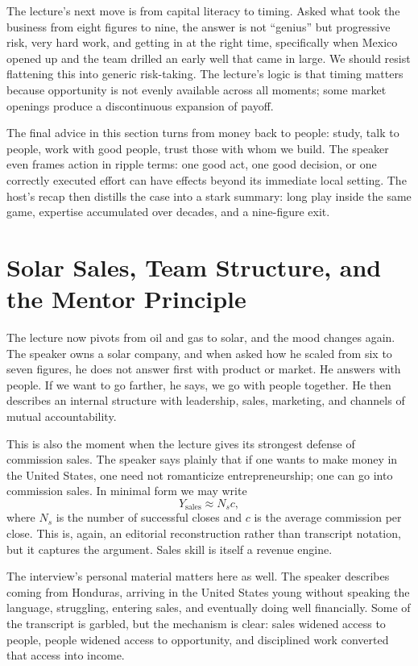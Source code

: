 The lecture's next move is from capital literacy to timing. Asked what took the business from eight figures to nine, the answer is not ``genius'' but progressive risk, very hard work, and getting in at the right time, specifically when Mexico opened up and the team drilled an early well that came in large. We should resist flattening this into generic risk-taking. The lecture's logic is that timing matters because opportunity is not evenly available across all moments; some market openings produce a discontinuous expansion of payoff.

The final advice in this section turns from money back to people: study, talk to people, work with good people, trust those with whom we build. The speaker even frames action in ripple terms: one good act, one good decision, or one correctly executed effort can have effects beyond its immediate local setting. The host's recap then distills the case into a stark summary: long play inside the same game, expertise accumulated over decades, and a nine-figure exit.

\section{Solar Sales, Team Structure, and the Mentor Principle}

The lecture now pivots from oil and gas to solar, and the mood changes again. The speaker owns a solar company, and when asked how he scaled from six to seven figures, he does not answer first with product or market. He answers with people. If we want to go farther, he says, we go with people together. He then describes an internal structure with leadership, sales, marketing, and channels of mutual accountability.

This is also the moment when the lecture gives its strongest defense of commission sales. The speaker says plainly that if one wants to make money in the United States, one need not romanticize entrepreneurship; one can go into commission sales. In minimal form we may write
\begin{equation}
Y_{\text{sales}} \approx N_s c,
\end{equation}
where \(N_s\) is the number of successful closes and \(c\) is the average commission per close. This is, again, an editorial reconstruction rather than transcript notation, but it captures the argument. Sales skill is itself a revenue engine.

The interview's personal material matters here as well. The speaker describes coming from Honduras, arriving in the United States young without speaking the language, struggling, entering sales, and eventually doing well financially. Some of the transcript is garbled, but the mechanism is clear: sales widened access to people, people widened access to opportunity, and disciplined work converted that access into income.

